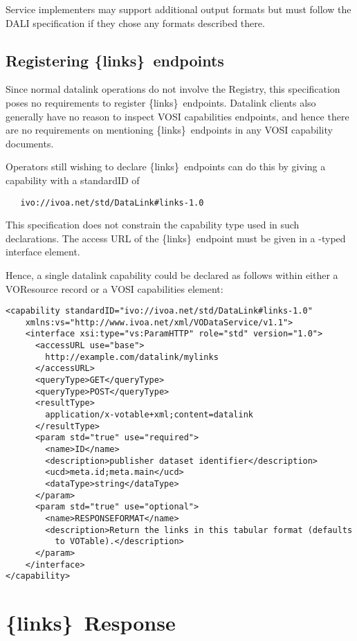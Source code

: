 \documentclass[11pt,a4paper]{ivoa}
\newcommand{\blinks}{\{links\}}
\begin{document}
Service implementers may support additional output formats but must follow
the DALI specification if they chose any formats described there.


\subsection{Registering \blinks~endpoints}

Since normal datalink operations do not involve the Registry, this
specification poses no requirements to register \blinks~endpoints.
Datalink clients also generally have no reason to inspect VOSI
capabilities endpoints, and hence there are no requirements on
mentioning \blinks~endpoints in any VOSI capability documents.

Operators still wishing to declare \blinks~endpoints can do this by
giving a capability with a standardID of
\begin{verbatim}
   ivo://ivoa.net/std/DataLink#links-1.0
\end{verbatim}

This specification does not constrain the capability type used in such
declarations.  The access URL of the \blinks~endpoint must be given in a
-typed interface element.

Hence, a single datalink capability could be declared as follows within
either a VOResource record or a VOSI capabilities element:

\begin{verbatim}
<capability standardID="ivo://ivoa.net/std/DataLink#links-1.0"
    xmlns:vs="http://www.ivoa.net/xml/VODataService/v1.1">
    <interface xsi:type="vs:ParamHTTP" role="std" version="1.0">
      <accessURL use="base">
        http://example.com/datalink/mylinks
      </accessURL>
      <queryType>GET</queryType>
      <queryType>POST</queryType>
      <resultType>
        application/x-votable+xml;content=datalink
      </resultType>
      <param std="true" use="required">
        <name>ID</name>
        <description>publisher dataset identifier</description>
        <ucd>meta.id;meta.main</ucd>
        <dataType>string</dataType>
      </param>
      <param std="true" use="optional">
        <name>RESPONSEFORMAT</name>
        <description>Return the links in this tabular format (defaults
          to VOTable).</description>
      </param>
    </interface>
</capability>
\end{verbatim}

\section{\blinks\ Response}
\end{document}
